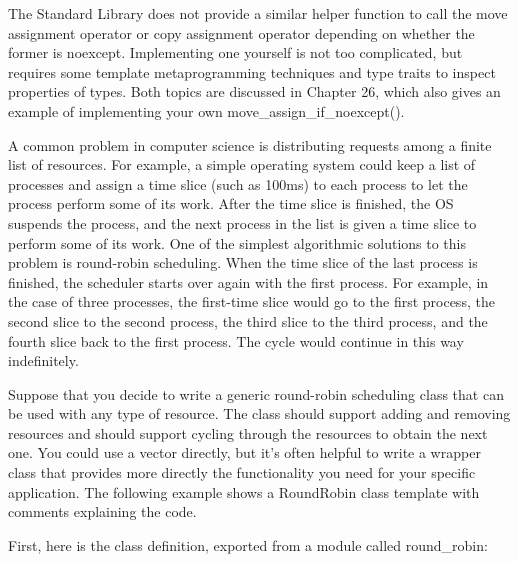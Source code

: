 The Standard Library does not provide a similar helper function to call the move assignment operator or copy assignment operator depending on whether the former is noexcept. Implementing one yourself is not too complicated, but requires some template metaprogramming techniques and type traits to inspect properties of types. Both topics are discussed in Chapter 26, which also gives an example of implementing your own move\_assign\_if\_noexcept().


A common problem in computer science is distributing requests among a finite list of resources. For example, a simple operating system could keep a list of processes and assign a time slice (such as 100ms) to each process to let the process perform some of its work. After the time slice is finished, the OS suspends the process, and the next process in the list is given a time slice to perform some of its work. One of the simplest algorithmic solutions to this problem is round-robin scheduling. When the time slice of the last process is finished, the scheduler starts over again with the first process. For example, in the case of three processes, the first-time slice would go to the first process, the second slice to the second process, the third slice to the third process, and the fourth slice back to the first process. The cycle would continue in this way indefinitely.

Suppose that you decide to write a generic round-robin scheduling class that can be used with any type of resource. The class should support adding and removing resources and should support cycling through the resources to obtain the next one. You could use a vector directly, but it’s often helpful to write a wrapper class that provides more directly the functionality you need for your specific application. The following example shows a RoundRobin class template with comments explaining the code.

First, here is the class definition, exported from a module called round\_robin:

